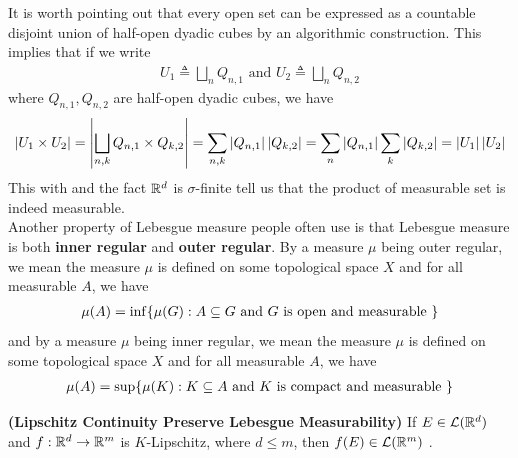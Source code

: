 \documentclass{report}
\begin{document}
\begin{mdframed}

\label{dyadic cube}

It is worth pointing out that every open set can be expressed as a countable disjoint union of half-open dyadic cubes by an algorithmic construction. This implies that if we write  
\begin{align*}
U_1\triangleq \bigsqcup_n Q_{n,1}\text{ and }U_2 \triangleq \bigsqcup_n Q_{n,2}
\end{align*}
where $Q_{n,1},Q_{n,2}$ are half-open dyadic cubes, we have 
\begin{align*}
\left|U_1\times U_2\right|=\left|\bigsqcup_{n,k}Q_{n,1}\times Q_{k,2}\right|=\sum_{n,k} \left|Q_{n,1}\right| \left|Q_{k,2}\right|= \sum_n \left|Q_{n,1}\right|\sum_{k} \left|Q_{k,2}\right|= \left|U_1\right|\left|U_2\right|
\end{align*}
This with   and the fact $\mathbb{R}^d$ is  $\sigma$-finite tell us that the product of measurable set is indeed measurable. \\

Another property of Lebesgue measure people often use is that Lebesgue measure is both \textbf{inner regular} and \textbf{outer regular}. By a measure $\mu$ being outer regular, we mean the measure $\mu$ is defined on some topological space $X$ and for all measurable $A$, we have 
 \begin{align*}
\mu (A)= \inf \{ \mu (G):A\subseteq G\text{ and }G\text{ is open and measurable } \}
\end{align*}
and by a measure $\mu$ being inner regular, we mean the measure $\mu$ is defined on some topological space $X$ and for all measurable  $A$, we have 
 \begin{align*}
\mu (A)= \sup \{ \mu (K):K \subseteq A\text{ and }K\text{ is compact and measurable } \}
\end{align*}

\end{mdframed}
\begin{theorem}
\textbf{(Lipschitz Continuity Preserve Lebesgue Measurability)} If $E\in \mathcal{L}(\mathbb{R}^d)$ and $f:\mathbb{R}^d\rightarrow \mathbb{R}^m$ is $K$-Lipschitz, where $d\leq m$, then  $f(E)\in \mathcal{L}(\mathbb{R}^m)$ .
\end{theorem}
\end{document}
